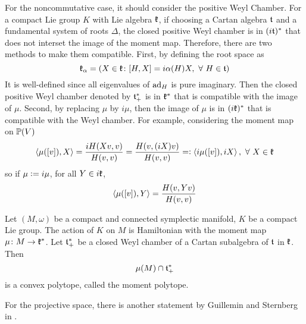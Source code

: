 \documentclass[a4paper,12pt]{article}
\begin{document}
	For the noncommutative case, it should consider the positive Weyl Chamber. For a compact Lie group $K$ with Lie algebra $\mathfrak{k}$, if choosing a Cartan algebra $\mathfrak{t}$ and a fundamental system of roots $\Delta$, the closed positive Weyl chamber is in $(i\mathfrak{t})^*$ that does not interset the image of the moment map. Therefore, there are two methods to make them compatible. First, by defining the root space as
	\begin{equation*}
		\mathfrak{k}_{\alpha} = \left(X  \in \mathfrak{k} \colon [H,X] = i\alpha(H)X,~\forall~H\in\mathfrak{t}\right)
	\end{equation*}
	It is well-defined since all eigenvalues of $\operatorname{ad}_H$ is pure imaginary. Then the closed positive Weyl chamber denoted by $\mathfrak{t}^*_+$ is in $\mathfrak{k}^*$ that is compatible with the image of $\mu$. Second, by replacing $\mu$ by $i\mu$, then the image of $\mu$ is in $(i\mathfrak{k})^*$ that is compatible with the Weyl chamber. For example, considering the moment map on $\mathbb{P}(V)$
	\begin{equation*}
		\left\langle \mu([v]),X \right\rangle = \frac{iH(Xv,v)}{H(v,v)} = \frac{H(v,(iX)v)}{H(v,v)} =\vcentcolon \left\langle i\mu([v]),iX \right\rangle,~\forall~X \in \mathfrak{k}
	\end{equation*}
	so if $\mu \vcentcolon= i\mu$, for all $Y \in i\mathfrak{k}$,
	\begin{equation*}
		\left\langle \mu([v]),Y \right\rangle = \frac{H(v,Yv)}{H(v,v)}
	\end{equation*}

	\begin{thm}[Kirwan]
		Let $(M,\omega)$ be a compact and connected symplectic manifold, $K$ be a compact Lie group. The action of $K$ on $M$ is Hamiltonian with the moment map $\mu \colon M \rightarrow \mathfrak{k}^*$. Let $\mathfrak{t}^*_+$ be a closed Weyl chamber of a Cartan subalgebra of $\mathfrak{t}$ in $\mathfrak{k}$. Then
		\begin{equation*}
			\mu(M) \cap \mathfrak{t}^*_+
		\end{equation*}
		is a convex polytope, called the moment polytope.
	\end{thm}

	For the projective space, there is another statement by Guillemin and Sternberg in \cite{key6}.
\end{document}
